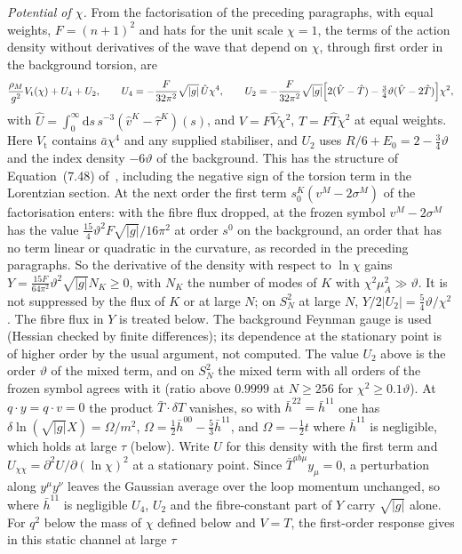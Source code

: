 \emph{Potential of \(\chi\).} From the factorisation of the preceding paragraphs, with equal weights, \(F=(n+1)^2\) and hats for the unit scale \(\chi=1\), the terms of the action density without derivatives of the wave that depend on \(\chi\), through first order in the background torsion, are
\[
\frac{\rho_M}{g^2}V_{\mathrm t}(\chi)+U_4+U_2,\qquad
U_4=-\frac{F}{32\pi^2}\sqrt{|g|}\,\hat U\chi^4,\qquad
U_2=-\frac{F}{32\pi^2}\sqrt{|g|}\Bigl[2(\hat V-\hat T)-\tfrac34\vartheta(\hat V-2\hat T)\Bigr]\chi^2,
\]
with \(\hat U=\int_0^\infty\mathrm ds\,s^{-3}(\hat v^K-\hat\tau^K)(s)\), and \(V=F\hat V\chi^2\), \(T=F\hat T\chi^2\) at equal weights. Here \(V_{\mathrm t}\) contains \(\bar a\chi^4\) and any supplied stabiliser, and \(U_2\) uses \(R/6+E_0=2-\tfrac34\vartheta\) and the index density \(-6\vartheta\) of the background. This has the structure of Equation~(7.48) of~\cite{Steinacker2023}, including the negative sign of the torsion term in the Lorentzian section. At the next order the first term \(s_0^K(v^M-2\sigma^M)\) of the factorisation enters: with the fibre flux dropped, at the frozen symbol \(v^M-2\sigma^M\) has the value \(\tfrac{15}{4}\vartheta^2F\sqrt{|g|}/16\pi^2\) at order \(s^0\) on the background, an order that has no term linear or quadratic in the curvature, as recorded in the preceding paragraphs. So the derivative of the density with respect to \(\ln\chi\) gains \(Y=\tfrac{15F}{64\pi^2}\vartheta^2\sqrt{|g|}N_K\ge0\), with \(N_K\) the number of modes of \(K\) with \(\chi^2\mu_A^2\gg\vartheta\). It is not suppressed by the flux of \(K\) or at large \(N\); on \(S^2_N\) at large \(N\), \(Y/2|U_2|=\tfrac54\vartheta/\chi^2\). The fibre flux in \(Y\) is treated below. The background Feynman gauge is used (Hessian checked by finite differences); its dependence at the stationary point is of higher order by the usual argument, not computed. The value \(U_2\) above is the order \(\vartheta\) of the mixed term, and on \(S^2_N\) the mixed term with all orders of the frozen symbol agrees with it (ratio above \(0.9999\) at \(N\ge256\) for \(\chi^2\ge0.1\vartheta\)). At \(q\cdot y=q\cdot v=0\) the product \(\bar T\cdot\delta T\) vanishes, so with \(\bar h^{22}=\bar h^{11}\) one has \(\delta\ln(\sqrt{|g|}X)=\Omega/m^2\), \(\Omega=\tfrac12\bar h^{00}-\tfrac53\bar h^{11}\), and \(\Omega=-\tfrac12t\) where \(\bar h^{11}\) is negligible, which holds at large \(\tau\) (below). Write \(U\) for this density with the first term and \(U_{\chi\chi}=\partial^2U/\partial(\ln\chi)^2\) at a stationary point. Since \(\bar T^{ab\mu}y_\mu=0\), a perturbation along \(y^\mu y^\nu\) leaves the Gaussian average over the loop momentum unchanged, so where \(\bar h^{11}\) is negligible \(U_4\), \(U_2\) and the fibre-constant part of \(Y\) carry \(\sqrt{|g|}\) alone. For \(q^2\) below the mass of \(\chi\) defined below and \(V=T\), the first-order response gives in this static channel at large \(\tau\)
